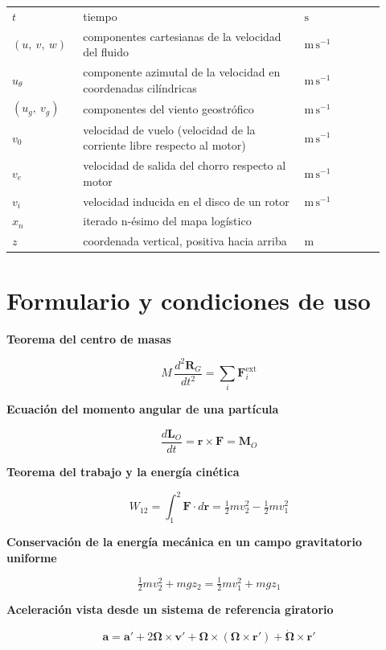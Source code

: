 \documentclass[10pt,openany]{book}
\begin{document}
\begin{longtable}{@{}>{\centering\arraybackslash}p{0.17\linewidth}>{\raggedright\arraybackslash}p{0.55\linewidth}>{\raggedright\arraybackslash}p{0.2\linewidth}@{}}
$t$ & tiempo & $\mathrm{s}$ \\
$\left( u, \  v, \  w\right)$ & componentes cartesianas de la velocidad del fluido & $\mathrm{m\,s^{-1}}$ \\
$u_\theta$ & componente azimutal de la velocidad en coordenadas cilíndricas & $\mathrm{m\,s^{-1}}$ \\
$\left( u_{g}, \  v_{g}\right)$ & componentes del viento geostrófico & $\mathrm{m\,s^{-1}}$ \\
$v_{0}$ & velocidad de vuelo (velocidad de la corriente libre respecto al motor) & $\mathrm{m\,s^{-1}}$ \\
$v_{e}$ & velocidad de salida del chorro respecto al motor & $\mathrm{m\,s^{-1}}$ \\
$v_{i}$ & velocidad inducida en el disco de un rotor & $\mathrm{m\,s^{-1}}$ \\
$x_{n}$ & iterado n-ésimo del mapa logístico &  \\
$z$ & coordenada vertical, positiva hacia arriba & $\mathrm{m}$ \\
\end{longtable}
\endgroup
\chapter{Formulario y condiciones de uso}

\noindent\textbf{Teorema del centro de masas}

\[
M\,\frac{d^{2}\mathbf{R}_G}{dt^{2}} = \sum_i \mathbf{F}_i^{\mathrm{ext}}
\]

\noindent\textbf{Ecuación del momento angular de una partícula}

\[
\frac{d\mathbf{L}_O}{dt} = \mathbf{r}\times\mathbf{F} = \mathbf{M}_O
\]

\noindent\textbf{Teorema del trabajo y la energía cinética}

\[
W_{12} = \int_{1}^{2}\mathbf{F}\cdot d\mathbf{r} = \tfrac{1}{2}m v_2^{2} - \tfrac{1}{2}m v_1^{2}
\]

\noindent\textbf{Conservación de la energía mecánica en un campo gravitatorio uniforme}

\[
\tfrac{1}{2}m v_2^{2} + m g z_2 = \tfrac{1}{2}m v_1^{2} + m g z_1
\]

\noindent\textbf{Aceleración vista desde un sistema de referencia giratorio}

\[
\mathbf{a} = \mathbf{a}' + 2\boldsymbol{\Omega}\times\mathbf{v}' + \boldsymbol{\Omega}\times\left(\boldsymbol{\Omega}\times\mathbf{r}'\right) + \dot{\boldsymbol{\Omega}}\times\mathbf{r}'
\]
\end{document}
